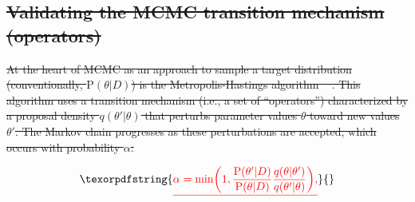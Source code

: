 \documentclass[oneside]{article}
\providecommand{\DIFdeltex}[1]{{\protect\color{red}\sout{#1}}}                      %
\providecommand{\DIFdelbegin}{} %
\providecommand{\DIFdelend}{} %
\providecommand{\DIFdel}[1]{\texorpdfstring{\DIFdeltex{#1}}{}} %
\newcommand{\DIFscaledelfig}{0.5}
\newlength{\DIFdelgraphicswidth} %
\newlength{\DIFdelgraphicsheight} %
\newcommand{\DIFdelincludegraphics}[2][]{%
\sbox{\DIFdelgraphicsbox}{\DIFOincludegraphics[#1]{#2}}%
\settoboxwidth{\DIFdelgraphicswidth}{\DIFdelgraphicsbox} %
\settoboxtotalheight{\DIFdelgraphicsheight}{\DIFdelgraphicsbox} %
\scalebox{\DIFscaledelfig}{%
\parbox[b]{\DIFdelgraphicswidth}{\usebox{\DIFdelgraphicsbox}\\[-\baselineskip] \rule{\DIFdelgraphicswidth}{0em}}\llap{\resizebox{\DIFdelgraphicswidth}{\DIFdelgraphicsheight}{%
\setlength{\unitlength}{\DIFdelgraphicswidth}%
\begin{picture}(1,1)%
\thicklines\linethickness{2pt} %
{\color[rgb]{1,0,0}\put(0,0){\framebox(1,1){}}}%
{\color[rgb]{1,0,0}\put(0,0){\line( 1,1){1}}}%
{\color[rgb]{1,0,0}\put(0,1){\line(1,-1){1}}}%
\end{picture}%
}\hspace*{3pt}}} %
} %
\DeclareRobustCommand{\DIFdelbegin}{\DIFOdelbegin \let\includegraphics\DIFdelincludegraphics} %
\DeclareRobustCommand{\DIFdelend}{\DIFOaddend \let\includegraphics\DIFOincludegraphics} %
\begin{document}

\DIFdelbegin \subsection*{\DIFdel{Validating the MCMC transition mechanism (operators)}}
\DIFdelend %

\DIFdelbegin \DIFdel{At the heart of MCMC as an approach to sample a target distribution
(conventionally, $\text{P}(\theta|D)$) is
the Metropolis-Hastings algorithm \mbox{%
\citep{metropolis53,mh}}\hspace{0pt}%
.
This algorithm uses a transition mechanism (i.e., a set of
``operators'') characterized by a proposal density $q(\theta'|\theta)$
that perturbs parameter values $\theta$ toward new values $\theta'$.
The Markov chain progresses as these perturbations are accepted, which
occurs with probability $\alpha$:
}\DIFdelend %

\DIFdelbegin \begin{displaymath}
  \DIFdel{\alpha = \text{min}\bigg(1, \frac{\text{P}(\theta'|D)}{\text{P}(\theta|D)} \frac{q(\theta|\theta')}{q(\theta'|\theta)} \bigg),
}\end{displaymath}%
\DIFdelend %
\end{document}
